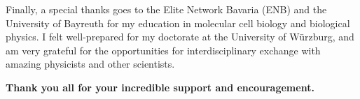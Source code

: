 \begin{center}
    \noindent Finally, a special thanks goes to the Elite Network Bavaria (ENB)
    and the University of Bayreuth for my education in molecular cell biology
    and biological physics. I felt well-prepared for my doctorate at the
    University of Würzburg, and am very grateful for the opportunities for
    interdisciplinary exchange with amazing physicists and other scientists.

    \noindent \textbf{Thank you all for your incredible support and encouragement.}

\end{center}